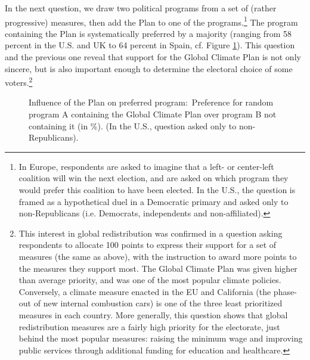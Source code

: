 \documentclass[a5paper,english,openany]{memoir}
\begin{document}
In the next question, we draw two political programs from a set of (rather progressive) measures, then add the Plan to one of the programs.\footnote{In Europe, respondents are asked to imagine that a left- or center-left coalition will win the next election, and are asked on which program they would prefer this coalition to have been elected. In the U.S., the question is framed as a hypothetical duel in a Democratic primary and asked only to non-Republicans (i.e. Democrats, independents and non-affiliated).} The program containing the Plan is systematically preferred by a majority (ranging from 58 percent in the U.S. and UK to 64 percent in Spain, cf. Figure \ref{fig:conjoint_left_ag_b}). This question and the previous one reveal that support for the Global Climate Plan is not only sincere, but is also important enough to determine the electoral choice of some voters.\footnote{This interest in 
global redistribution was %
confirmed in a question asking respondents to allocate 100 points to express their support for a set of measures (the same as above), with the instruction to award more points to the measures they support most. The Global Climate Plan was %
given higher than average priority, and was  %
one of the most popular climate policies. Conversely, a climate measure enacted in the EU and California (the phase-out of new internal combustion cars) is one of the three least prioritized %
measures in each country. More generally, this question shows that global redistribution measures are a fairly high priority for the electorate, just behind the most popular measures: raising the minimum wage and improving public services through additional funding for education and healthcare.} 

\begin{figure}[h!] 
  \caption[Influence of Plan on preferred program]{Influence of the Plan on preferred program:\ Preference for random program A containing the Global Climate Plan over program B not containing it (in \%). (In the U.S., question asked only to non-Republicans).}\label{fig:conjoint_left_ag_b}
\end{figure}
\end{document}
